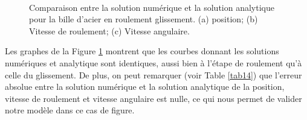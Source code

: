 \begin{figure}[h!]
\hspace{\fill}
\hspace{\fill}
   \\
\caption{\label{slide_roll_one}Comparaison entre la solution numérique et la solution analytique pour la bille d'acier en roulement glissement. (a) position; (b) Vitesse de roulement; (c) Vitesse angulaire.}
\end{figure}


Les graphes de la Figure \ref{slide_roll_one} montrent que les courbes donnant les solutions numériques et analytique sont identiques, aussi bien à l'étape de roulement qu'à celle du glissement. De plus, on peut remarquer (voir Table \ref{tab14}) que l'erreur absolue entre la solution numérique et la solution analytique de la position, vitesse de roulement et vitesse angulaire est nulle, ce qui nous permet de valider notre modèle dans ce cas de figure.

